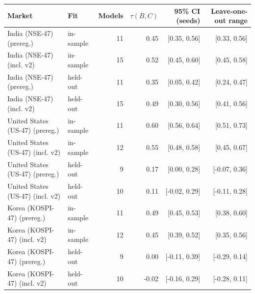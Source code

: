 \begin{tabular}{llrrrr}
\toprule
Market & Fit & Models & $\tau(B,C)$ & 95\% CI (seeds) & Leave-one-out range \\
\midrule
India (NSE-47) (prereg.) & in-sample & 11 & 0.45 & [0.35, 0.56] & [0.33, 0.56] \\
India (NSE-47) (incl. v2) & in-sample & 15 & 0.52 & [0.45, 0.60] & [0.45, 0.58] \\
India (NSE-47) (prereg.) & held-out & 11 & 0.35 & [0.05, 0.42] & [0.24, 0.47] \\
India (NSE-47) (incl. v2) & held-out & 15 & 0.49 & [0.30, 0.56] & [0.41, 0.56] \\
United States (US-47) (prereg.) & in-sample & 11 & 0.60 & [0.56, 0.64] & [0.51, 0.73] \\
United States (US-47) (incl. v2) & in-sample & 12 & 0.55 & [0.48, 0.58] & [0.45, 0.67] \\
United States (US-47) (prereg.) & held-out & 9 & 0.17 & [0.00, 0.28] & [-0.07, 0.36] \\
United States (US-47) (incl. v2) & held-out & 10 & 0.11 & [-0.02, 0.29] & [-0.11, 0.28] \\
Korea (KOSPI-47) (prereg.) & in-sample & 11 & 0.49 & [0.45, 0.53] & [0.38, 0.60] \\
Korea (KOSPI-47) (incl. v2) & in-sample & 12 & 0.45 & [0.39, 0.52] & [0.35, 0.56] \\
Korea (KOSPI-47) (prereg.) & held-out & 9 & 0.00 & [-0.11, 0.39] & [-0.29, 0.14] \\
Korea (KOSPI-47) (incl. v2) & held-out & 10 & -0.02 & [-0.16, 0.29] & [-0.28, 0.11] \\
\bottomrule
\end{tabular}
